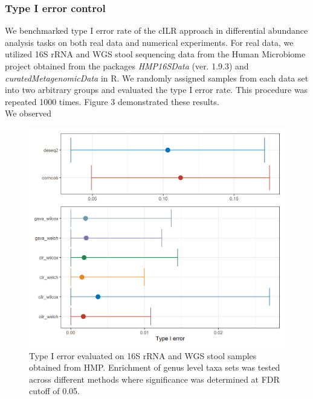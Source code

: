 \documentclass{article}
\begin{document}
\subsubsection*{Type I error control}
We benchmarked type I error rate of the cILR approach in differential abundance analysis tasks on both real data and numerical experiments. For real data, we utilized 16S rRNA and WGS stool sequencing data from the Human Microbiome project obtained from the packages \emph{HMP16SData} (ver. 1.9.3) and \emph{curatedMetagenomicData} in R. We randomly assigned samples from each data set into two arbitrary groups and evaluated the type I error rate. This procedure was repeated 1000 times. Figure 3 demonstrated these results.\\
We observed 
\begin{figure}[H]
    \centering
    \includegraphics[scale=0.5]{figures/null_16s_da.png}
    \caption{Type I error evaluated on 16S rRNA and WGS stool samples obtained from HMP. Enrichment of genus level taxa sets was tested across different methods where significance was determined at FDR cutoff of 0.05.}
\end{figure}

\newpage
{}

\end{document}
